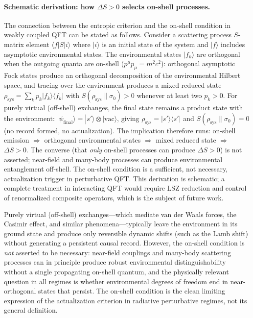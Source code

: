 \documentclass[11pt,a4paper]{article}
\theoremstyle{plain}
\theoremstyle{definition}
\theoremstyle{remark}
\begin{document}
\paragraph{Schematic derivation: how $\Delta S > 0$ selects on-shell processes.}
The connection between the entropic criterion and the on-shell condition
in weakly coupled QFT can be stated as follows. Consider a scattering
process $S$-matrix element $\langle f | S | i \rangle$ where $|i\rangle$
is an initial state of the system and $|f\rangle$ includes asymptotic
environmental states. The environmental states $|f_k\rangle$ are orthogonal
when the outgoing quanta are on-shell ($p^\mu p_\mu = m^2 c^2$): orthogonal
asymptotic Fock states produce an orthogonal decomposition of the
environmental Hilbert space, and tracing over the environment produces
a mixed reduced state $\rho_{\mathrm{sys}} = \sum_k p_k |f_k\rangle\langle f_k|$
with $S(\rho_{\mathrm{sys}}\|\sigma_0) > 0$ whenever at least two $p_k > 0$.
For purely virtual (off-shell) exchanges, the final state remains a product
state with the environment: $|\psi_{\mathrm{final}}\rangle = |s'\rangle \otimes
|\mathrm{vac}\rangle$, giving $\rho_{\mathrm{sys}} = |s'\rangle\langle s'|$
and $S(\rho_{\mathrm{sys}}\|\sigma_0) = 0$ (no record formed, no actualization).
The implication therefore runs: on-shell emission $\Rightarrow$ orthogonal
environmental states $\Rightarrow$ mixed reduced state $\Rightarrow$
$\Delta S > 0$. The converse (that \emph{only} on-shell processes can
produce $\Delta S > 0$) is not asserted; near-field and many-body processes
can produce environmental entanglement off-shell. The on-shell condition
is a sufficient, not necessary, actualization trigger in perturbative QFT.
This derivation is schematic; a complete treatment in interacting QFT would
require LSZ reduction and control of renormalized composite operators,
which is the subject of future work.

Purely virtual (off-shell)
exchanges---which mediate van der Waals forces, the Casimir effect, and similar
phenomena---typically leave the environment in its ground state and produce only
reversible dynamic shifts (such as the Lamb shift) without generating a persistent
causal record. However, the on-shell condition is \emph{not} asserted to be
necessary: near-field couplings and many-body scattering processes can in
principle produce robust environmental distinguishability without a single
propagating on-shell quantum, and the physically relevant question in all regimes
is whether environmental degrees of freedom end in near-orthogonal states that
persist. The on-shell condition is the clean limiting expression of the
actualization criterion in radiative perturbative regimes, not its general
definition.
\end{document}
